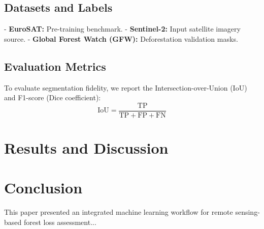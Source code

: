 \documentclass[journal,10pt]{IEEEtran}
\begin{document}
\subsection{Datasets and Labels}
- \textbf{EuroSAT:} Pre-training benchmark.
- \textbf{Sentinel-2:} Input satellite imagery source.
- \textbf{Global Forest Watch (GFW):} Deforestation validation masks.

\subsection{Evaluation Metrics}
To evaluate segmentation fidelity, we report the Intersection-over-Union (IoU) and F1-score (Dice coefficient):
\begin{equation}
\text{IoU} = \frac{\text{TP}}{\text{TP} + \text{FP} + \text{FN}}
\end{equation}

\section{Results and Discussion}

\section{Conclusion}
This paper presented an integrated machine learning workflow for remote sensing-based forest loss assessment...



\end{document}
